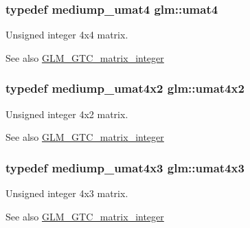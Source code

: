 \subsubsection[{\texorpdfstring{umat4}{umat4}}]{\setlength{\rightskip}{0pt plus 5cm}typedef mediump\+\_\+umat4 {\bf glm\+::umat4}}\hypertarget{group__gtc__matrix__integer_ga7ae562000d8a8d193e9f93cf51e2e113}{}\label{group__gtc__matrix__integer_ga7ae562000d8a8d193e9f93cf51e2e113}
Unsigned integer 4x4 matrix. \begin{DoxySeeAlso}{See also}
\hyperlink{group__gtc__matrix__integer}{G\+L\+M\+\_\+\+G\+T\+C\+\_\+matrix\+\_\+integer} 
\end{DoxySeeAlso}
\subsubsection[{\texorpdfstring{umat4x2}{umat4x2}}]{\setlength{\rightskip}{0pt plus 5cm}typedef mediump\+\_\+umat4x2 {\bf glm\+::umat4x2}}\hypertarget{group__gtc__matrix__integer_ga13e8392218e9b6e1b7f194a21b5c88bf}{}\label{group__gtc__matrix__integer_ga13e8392218e9b6e1b7f194a21b5c88bf}
Unsigned integer 4x2 matrix. \begin{DoxySeeAlso}{See also}
\hyperlink{group__gtc__matrix__integer}{G\+L\+M\+\_\+\+G\+T\+C\+\_\+matrix\+\_\+integer} 
\end{DoxySeeAlso}
\subsubsection[{\texorpdfstring{umat4x3}{umat4x3}}]{\setlength{\rightskip}{0pt plus 5cm}typedef mediump\+\_\+umat4x3 {\bf glm\+::umat4x3}}\hypertarget{group__gtc__matrix__integer_ga08373f5588a54da1a48e5e55c7d51004}{}\label{group__gtc__matrix__integer_ga08373f5588a54da1a48e5e55c7d51004}
Unsigned integer 4x3 matrix. \begin{DoxySeeAlso}{See also}
\hyperlink{group__gtc__matrix__integer}{G\+L\+M\+\_\+\+G\+T\+C\+\_\+matrix\+\_\+integer} 
\end{DoxySeeAlso}
